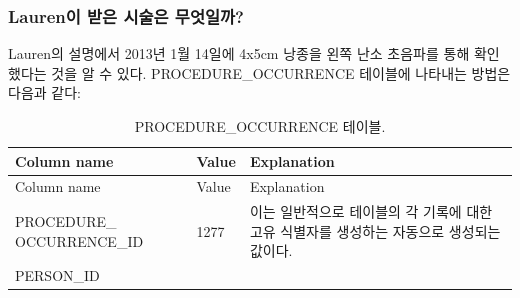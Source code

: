 \documentclass[11pt]{book}
\theoremstyle{definition}
\theoremstyle{definition}
\theoremstyle{definition}
\theoremstyle{remark}
\begin{document}
\subsubsection*{Lauren이 받은 시술은 무엇일까?}\label{lauren---}

Lauren의 설명에서 2013년 1월 14일에 4x5cm 낭종을 왼쪽 난소 초음파를 통해
확인했다는 것을 알 수 있다. PROCEDURE\_OCCURRENCE 테이블에 나타내는
방법은 다음과 같다:

\begin{longtable}[]{@{}lll@{}}
\caption{\label{tab:procedureOccurrence} PROCEDURE\_OCCURRENCE
테이블.}\tabularnewline
\toprule
\begin{minipage}[b]{0.28\columnwidth}\raggedright\strut
Column name\strut
\end{minipage} & \begin{minipage}[b]{0.16\columnwidth}\raggedright\strut
Value\strut
\end{minipage} & \begin{minipage}[b]{0.48\columnwidth}\raggedright\strut
Explanation\strut
\end{minipage}\tabularnewline
\midrule
\endfirsthead
\toprule
\begin{minipage}[b]{0.28\columnwidth}\raggedright\strut
Column name\strut
\end{minipage} & \begin{minipage}[b]{0.16\columnwidth}\raggedright\strut
Value\strut
\end{minipage} & \begin{minipage}[b]{0.48\columnwidth}\raggedright\strut
Explanation\strut
\end{minipage}\tabularnewline
\midrule
\endhead
\begin{minipage}[t]{0.28\columnwidth}\raggedright\strut
PROCEDURE\_ OCCURRENCE\_ID\strut
\end{minipage} & \begin{minipage}[t]{0.16\columnwidth}\raggedright\strut
1277\strut
\end{minipage} & \begin{minipage}[t]{0.48\columnwidth}\raggedright\strut
이는 일반적으로 테이블의 각 기록에 대한 고유 식별자를 생성하는 자동으로
생성되는 값이다.\strut
\end{minipage}\tabularnewline
\begin{minipage}[t]{0.28\columnwidth}\raggedright\strut
PERSON\_ID\strut
\end{minipage} & \begin{minipage}[t]{0.16\columnwidth}\raggedright\strut

\end{minipage}
\end{longtable}
\end{document}
